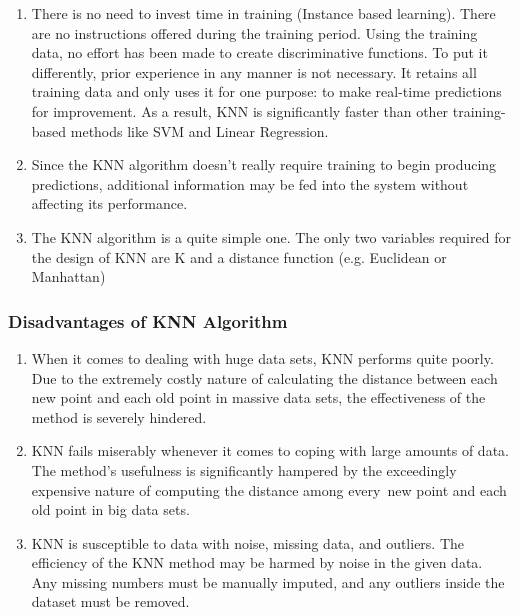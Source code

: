 \documentclass[a4paper]{article}
\begin{document}
\begin{enumerate}
    \item There is no need to invest time in training (Instance based learning). There are no instructions offered during the training period. Using the training data, no effort has been made to create discriminative functions. To put it differently, prior experience in any manner is not necessary. It retains all training data and only uses it for one purpose: to make real-time predictions for improvement. As a result, KNN is significantly faster than other training-based methods like SVM and Linear Regression.
    
    \item Since the KNN algorithm doesn't really require training to begin producing predictions, additional information may be fed into the system without affecting its performance.
    
    \item The KNN algorithm is a quite simple one. The only two variables required for the design of KNN are K and a distance function (e.g. Euclidean or Manhattan)
\end{enumerate}

\subsubsection{Disadvantages of KNN Algorithm}
\begin{enumerate}
    \item When it comes to dealing with huge data sets, KNN performs quite poorly. Due to the extremely costly nature of calculating the distance between each new point and each old point in massive data sets, the effectiveness of the method is severely hindered.

    \item KNN fails miserably whenever it comes to coping with large amounts of data. The method's usefulness is significantly hampered by the exceedingly expensive nature of computing the distance among every new point and each old point in big data sets.
    
    \item KNN is susceptible to data with noise, missing data, and outliers. The efficiency of the KNN method may be harmed by noise in the given data. Any missing numbers must be manually imputed, and any outliers inside the dataset must be removed.
\end{enumerate}
\end{document}
